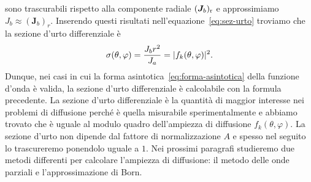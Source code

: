 \documentclass[a4paper,fleqn,twoside,12pt]{article}
\renewcommand{\phi}{\varphi}
\DeclarePairedDelimiter{\abs}{\lvert}{\rvert}
\begin{document}
sono trascurabili rispetto alla componente radiale $(\bm{J}_{b})_{\textup{r}}$ e
approssimiamo $J_{b} \approx (\bm{J}_{b})_{r}$.  Inserendo questi risultati
nell'equazione~\eqref{eq:sez-urto} troviamo che la sezione d'urto differenziale
è
\begin{equation}
  \label{eq:sez-urto-mq}
  \sigma(\theta,\phi) = \frac{J_{b}r^{2}}{J_{a}} = \abs{f_{k}(\theta,\phi)}^{2}.
\end{equation}
Dunque, nei casi in cui la forma asintotica~\eqref{eq:forma-asintotica} della
funzione d'onda è valida, la sezione d'urto differenziale è calcolabile con la
formula precedente.  La sezione d'urto differenziale è la quantità di maggior
interesse nei problemi di diffusione perché è quella misurabile sperimentalmente
e abbiamo trovato che è uguale al modulo quadro dell'ampiezza di diffusione
$f_{k}(\theta,\phi)$.  La sezione d'urto non dipende dal fattore di
normalizzazione $A$ e spesso nel seguito lo trascureremo ponendolo uguale a $1$.
Nei prossimi paragrafi studieremo due metodi differenti per calcolare l'ampiezza
di diffusione: il metodo delle onde parziali e l'approssimazione di Born.
\end{document}
